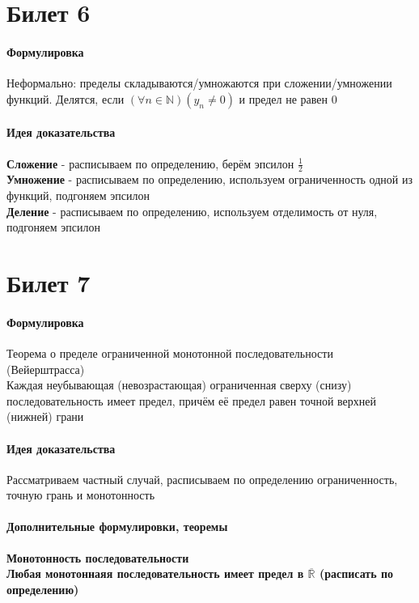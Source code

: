 \documentclass[a4paper,10pt]{article}
\begin{document}
	\section{Билет 6}
	\begin{center} 
		\item \paragraph{Формулировка} 
	\end{center}
	Неформально: пределы складываются/умножаются при сложении/умножении функций. Делятся, если $(\forall n \in \mathbb{N}) (y_{n} \neq 0)$ и предел не равен 0
	\begin{center} 
		\item \paragraph{Идея доказательства} 
	\end{center}
	\textbf{Сложение} - расписываем по определению, берём эпсилон $\frac{1}{2}$ \\
	\textbf{Умножение} - расписываем по определению, используем ограниченность одной из функций, подгоняем эпсилон \\
	\textbf{Деление} - расписываем по определению, используем отделимость от нуля, подгоняем эпсилон \\
	\section{Билет 7}
	\begin{center} 
		\item \paragraph{Формулировка} 
	\end{center}
	Теорема о пределе ограниченной монотонной последовательности (Вейерштрасса) \\
	Каждая неубывающая (невозрастающая) ограниченная сверху (снизу) последовательность имеет предел, причём её предел равен точной верхней (нижней) грани
	\begin{center} 
		\item \paragraph{Идея доказательства} 
	\end{center}
	Рассматриваем частный случай, расписываем по определению ограниченность, точную грань и монотонность
	\begin{center} 
		\item \paragraph{Дополнительные формулировки, теоремы} 
	\end{center}
	\textbf{Монотонность последовательности} \\
	\textbf{Любая монотоннаяя последовательность имеет предел в $\overline{\mathbb{R}}$ (расписать по определению)}
\end{document}
